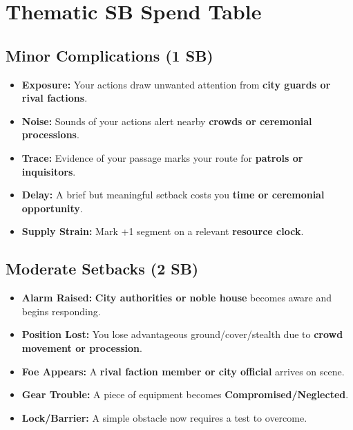
\section*{Thematic SB Spend Table}
\label{sec:ecktoria-sb}

\subsection*{Minor Complications (1 SB)}
\begin{itemize}
\item \textbf{Exposure:} Your actions draw unwanted attention from \textbf{city guards or rival factions}.
\item \textbf{Noise:} Sounds of your actions alert nearby \textbf{crowds or ceremonial processions}.
\item \textbf{Trace:} Evidence of your passage marks your route for \textbf{patrols or inquisitors}.
\item \textbf{Delay:} A brief but meaningful setback costs you \textbf{time or ceremonial opportunity}.
\item \textbf{Supply Strain:} Mark +1 segment on a relevant \textbf{resource clock}.
\end{itemize}

\subsection*{Moderate Setbacks (2 SB)}
\begin{itemize}
\item \textbf{Alarm Raised:} \textbf{City authorities or noble house} becomes aware and begins responding.
\item \textbf{Position Lost:} You lose advantageous ground/cover/stealth due to \textbf{crowd movement or procession}.
\item \textbf{Foe Appears:} A \textbf{rival faction member or city official} arrives on scene.
\item \textbf{Gear Trouble:} A piece of equipment becomes \textbf{Compromised/Neglected}.
\item \textbf{Lock/Barrier:} A simple obstacle now requires a test to overcome.
\end{itemize}


